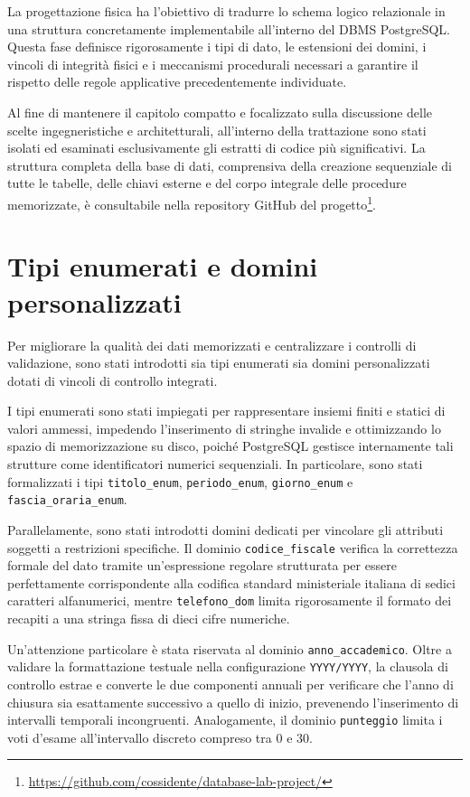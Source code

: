La progettazione fisica ha l'obiettivo di tradurre lo schema logico relazionale in una struttura concretamente implementabile all'interno del DBMS PostgreSQL. Questa fase definisce rigorosamente i tipi di dato, le estensioni dei domini, i vincoli di integrità fisici e i meccanismi procedurali necessari a garantire il rispetto delle regole applicative precedentemente individuate.

Al fine di mantenere il capitolo compatto e focalizzato sulla discussione delle scelte ingegneristiche e architetturali, all'interno della trattazione sono stati isolati ed esaminati esclusivamente gli estratti di codice più significativi. La struttura completa della base di dati, comprensiva della creazione sequenziale di tutte le tabelle, delle chiavi esterne e del corpo integrale delle procedure memorizzate, è consultabile nella repository GitHub del progetto\footnote{\url{https://github.com/cossidente/database-lab-project/}}.

\section{Tipi enumerati e domini personalizzati}
\label{sec:tipi-enumerati-e-domini-personalizzati}

Per migliorare la qualità dei dati memorizzati e centralizzare i controlli di validazione, sono stati introdotti sia tipi enumerati sia domini personalizzati dotati di vincoli di controllo integrati.

I tipi enumerati sono stati impiegati per rappresentare insiemi finiti e statici di valori ammessi, impedendo l'inserimento di stringhe invalide e ottimizzando lo spazio di memorizzazione su disco, poiché PostgreSQL gestisce internamente tali strutture come identificatori numerici sequenziali.
In particolare, sono stati formalizzati i tipi \texttt{titolo\_enum}, \texttt{periodo\_enum}, \texttt{giorno\_enum} e \texttt{fascia\_oraria\_enum}.

Parallelamente, sono stati introdotti domini dedicati per vincolare gli attributi soggetti a restrizioni specifiche.
Il dominio \texttt{codice\_fiscale} verifica la correttezza formale del dato tramite un'espressione regolare strutturata per essere perfettamente corrispondente alla codifica standard ministeriale italiana di sedici caratteri alfanumerici, mentre \texttt{telefono\_dom} limita rigorosamente il formato dei recapiti a una stringa fissa di dieci cifre numeriche.

Un'attenzione particolare è stata riservata al dominio \texttt{anno\_accademico}. Oltre a validare la formattazione testuale nella configurazione \texttt{YYYY/YYYY}, la clausola di controllo estrae e converte le due componenti annuali per verificare che l'anno di chiusura sia esattamente successivo a quello di inizio, prevenendo l'inserimento di intervalli temporali incongruenti.
Analogamente, il dominio \texttt{punteggio} limita i voti d'esame all'intervallo discreto compreso tra 0 e 30.

